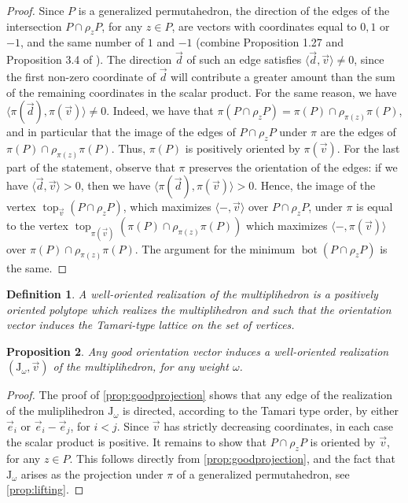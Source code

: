 \documentclass[twoside, 12pt]{amsart}
\newtheorem{definition}{Definition}[section]
\newtheorem{proposition}[definition]{Proposition}
\theoremstyle{remark}
\newcommand{\J}{\mathrm{J}}
\DeclareMathOperator{\tp}{top}
\DeclareMathOperator{\bm}{bot}
\begin{document}
\begin{proof} 
  Since $P$ is a generalized permutahedron, the direction of the edges of the intersection $P\cap\rho_z P$, for any $z \in P$, are vectors with coordinates equal to $0,1$ or $-1$, and the same number of $1$ and $-1$ (combine Proposition 1.27 and Proposition 3.4 of \cite{LA21}). 
  The direction $\vec d$ of such an edge satisfies $\langle \vec d, \vec v \rangle \neq 0$, since the first non-zero coordinate of $\vec d$ will contribute a greater amount than the sum of the remaining coordinates in the scalar product.  
  For the same reason, we have $\langle \pi(\vec d), \pi(\vec v) \rangle \neq 0$. 
  Indeed, we have that $\pi(P\cap\rho_z P)=\pi(P)\cap\rho_{\pi(z)}\pi(P)$, and in particular that the image of the edges of $P\cap\rho_z P$ under $\pi$ are the edges of $\pi(P)\cap\rho_{\pi(z)}\pi(P)$. 
  Thus, $\pi(P)$ is positively oriented by $\pi(\vec v)$. 
  For the last part of the statement, observe that $\pi$ preserves the orientation of the edges: if we have $\langle \vec d, \vec v \rangle >0$, then we have $\langle \pi(\vec d), \pi(\vec v) \rangle > 0$. 
  Hence, the image of the vertex $\tp_{\vec v}(P\cap\rho_z P)$, which maximizes $\langle - ,\vec v \rangle$ over $P\cap\rho_z P$, under $\pi$ is equal to the vertex $\tp_{\pi(\vec v)}(\pi(P)\cap\rho_{\pi(z)} \pi(P))$ which maximizes $\langle - ,\pi(\vec v) \rangle$ over $\pi(P)\cap\rho_{\pi(z)} \pi(P)$. The argument for the minimum $\bm(P\cap\rho_z P)$ is the same.
\end{proof}

\begin{definition}
A \emph{well-oriented realization of the multiplihedron} is a positively oriented polytope which realizes the multiplihedron and such that the orientation vector induces the Tamari-type lattice on the set of vertices. 
\end{definition}

\begin{proposition}
\label{prop:OrientationVector}
Any good orientation vector induces a well-oriented realization $(\J_\omega, \vec v)$ of the multiplihedron, for any weight $\omega$. 
\end{proposition}

\begin{proof}
  The proof of \cref{prop:goodprojection} shows that any edge of the realization of the muliplihedron $\J_\omega$ is directed, according to the Tamari type order, by either $\vec e_i$ or $\vec e_i-\vec e_j$, for $i<j$. 
  Since $\vec v$ has strictly decreasing coordinates, in each case the scalar product is positive. 
  It remains to show that $P\cap\rho_z P$ is oriented by $\vec v$, for any $z \in P$. 
  This follows directly from \cref{prop:goodprojection}, and the fact that $\J_\omega$ arises as the projection under $\pi$ of a generalized permutahedron, see \cref{prop:lifting}.
\end{proof}
\end{document}
